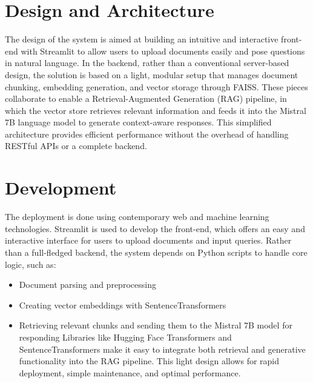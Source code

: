 \documentclass[12pt]{report}
\begin{document}
\section{Design and Architecture}
The design of the system is aimed at building an intuitive and interactive front-end with Streamlit to allow users to upload documents easily and pose questions in natural language. In the backend, rather than a conventional server-based design, the solution is based on a light, modular setup that manages document chunking, embedding generation, and vector storage through FAISS. These pieces collaborate to enable a Retrieval-Augmented Generation (RAG) pipeline, in which the vector store retrieves relevant information and feeds it into the Mistral 7B language model to generate context-aware responses. This simplified architecture provides efficient performance without the overhead of handling RESTful APIs or a complete backend.

\section{Development}
The deployment is done using contemporary web and machine learning technologies. Streamlit is used to develop the front-end, which offers an easy and interactive interface for users to upload documents and input queries. Rather than a full-fledged backend, the system depends on Python scripts to handle core logic, such as:
\begin{itemize}
    \item Document parsing and preprocessing
    \item Creating vector embeddings with SentenceTransformers
    \item Retrieving relevant chunks and sending them to the Mistral 7B model for responding
Libraries like Hugging Face Transformers and SentenceTransformers make it easy to integrate both retrieval and generative functionality into the RAG pipeline. This light design allows for rapid deployment, simple maintenance, and optimal performance.
\end{itemize}
\end{document}
